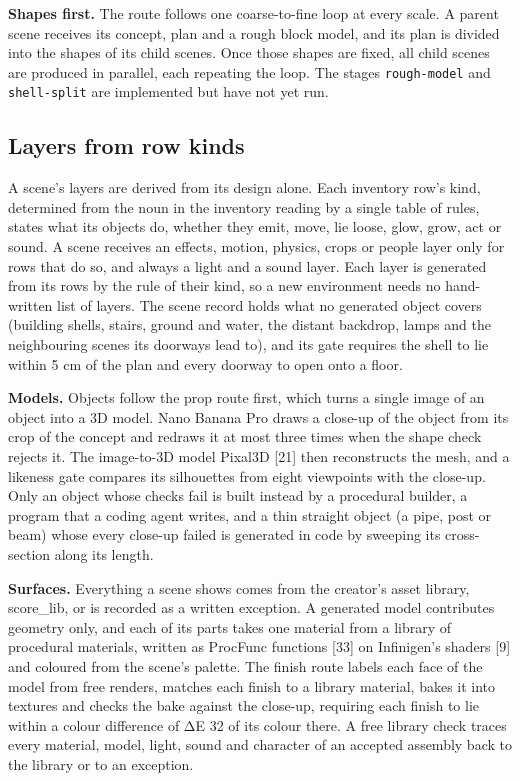 \documentclass[
  11pt,
]{article}
\begin{document}
\textbf{Shapes first.} The route follows one coarse-to-fine loop at
every scale. A parent scene receives its concept, plan and a rough block
model, and its plan is divided into the shapes of its child scenes. Once
those shapes are fixed, all child scenes are produced in parallel, each
repeating the loop. The stages \texttt{rough-model} and
\texttt{shell-split} are implemented but have not yet run.

\subsection{Layers from row kinds}\label{layers-from-row-kinds}

A scene's layers are derived from its design alone. Each inventory row's
kind, determined from the noun in the inventory reading by a single
table of rules, states what its objects do, whether they emit, move, lie
loose, glow, grow, act or sound. A scene receives an effects, motion,
physics, crops or people layer only for rows that do so, and always a
light and a sound layer. Each layer is generated from its rows by the
rule of their kind, so a new environment needs no hand-written list of
layers. The scene record holds what no generated object covers (building
shells, stairs, ground and water, the distant backdrop, lamps and the
neighbouring scenes its doorways lead to), and its gate requires the
shell to lie within 5 cm of the plan and every doorway to open onto a
floor.

\textbf{Models.} Objects follow the prop route first, which turns a
single image of an object into a 3D model. Nano Banana Pro draws a
close-up of the object from its crop of the concept and redraws it at
most three times when the shape check rejects it. The image-to-3D model
Pixal3D {[}21{]} then reconstructs the mesh, and a likeness gate
compares its silhouettes from eight viewpoints with the close-up. Only
an object whose checks fail is built instead by a procedural builder, a
program that a coding agent writes, and a thin straight object (a pipe,
post or beam) whose every close-up failed is generated in code by
sweeping its cross-section along its length.

\textbf{Surfaces.} Everything a scene shows comes from the creator's
asset library, score\_lib, or is recorded as a written exception. A
generated model contributes geometry only, and each of its parts takes
one material from a library of procedural materials, written as ProcFunc
functions {[}33{]} on Infinigen's shaders {[}9{]} and coloured from the
scene's palette. The finish route labels each face of the model from
free renders, matches each finish to a library material, bakes it into
textures and checks the bake against the close-up, requiring each finish
to lie within a colour difference of ΔE 32 of its colour there. A free
library check traces every material, model, light, sound and character
of an accepted assembly back to the library or to an exception.
\end{document}
